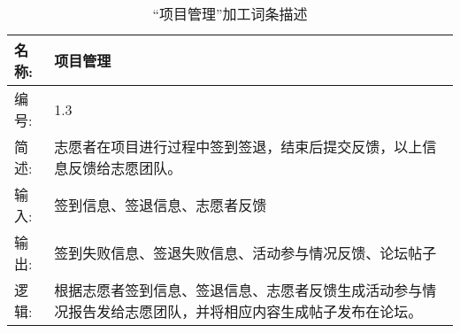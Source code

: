 \begin{table}[H]  
\caption{“项目管理”加工词条描述}  
\begin{center}  
    \begin{tabular}{l p{11cm}} 
        \hline
        \quad 名称: & 项目管理 \\
        \hline
        \quad 编号: & 1.3 \\
        \hline
        \quad 简述: & 志愿者在项目进行过程中签到签退，结束后提交反馈，以上信息反馈给志愿团队。 \\
        \hline
        \quad 输入: & 签到信息、签退信息、志愿者反馈 \\
        \hline
        \quad 输出: & 签到失败信息、签退失败信息、活动参与情况反馈、论坛帖子 \\
        \hline
        \quad 逻辑: & 根据志愿者签到信息、签退信息、志愿者反馈生成活动参与情况报告发给志愿团队，并将相应内容生成帖子发布在论坛。 \\
        \hline
    \end{tabular}
    \label{tab1}
\end{center}
\end{table}